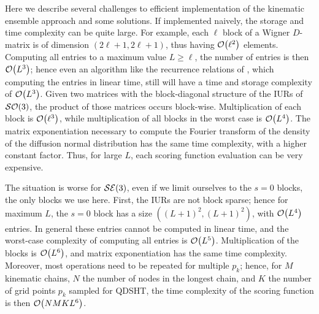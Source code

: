\documentclass[../../main.tex]{subfiles}
\begin{document}
\begin{refsection}
	Here we describe several challenges to efficient implementation of the kinematic ensemble approach and some solutions.
	If implemented naively, the storage and time complexity can be quite large.
	For example, each $\ell$ block of a Wigner $D$-matrix is of dimension $(2\ell+1,2\ell+1)$, thus having $\order{\ell^2}$ elements.
	Computing all entries to a maximum value $L \ge \ell$, the number of entries is then $\order{L^3}$; hence even an algorithm like the recurrence relations of \cite{choiRapidStableDetermination1999}, which computing the entries in linear time, still will have a time and storage complexity of $\order{L^3}$.
	Given two matrices with the block-diagonal structure of the IURs of $\mathcal{SO} (3)$, the product of those matrices occurs block-wise.
	Multiplication of each block is $\order{\ell^3}$, while multiplication of all blocks in the worst case is $\order{L^4}$.
	The matrix exponentiation necessary to compute the Fourier transform of the density of the diffusion normal distribution has the same time complexity, with a higher constant factor.
	Thus, for large $L$, each scoring function evaluation can be very expensive.

	The situation is worse for $\mathcal{SE} (3)$, even if we limit ourselves to the $s=0$ blocks, the only blocks we use here.
	First, the IURs are not block sparse; hence for maximum $L$, the $s=0$ block has a size $((L+1)^2,(L+1)^2)$, with $\order{L^4}$ entries.
	In general these entries cannot be computed in linear time, and the worst-case complexity of computing all entries is $\order{L^5}$.
	Multiplication of the blocks is $\order{L^6}$, and matrix exponentiation has the same time complexity.
	Moreover, most operations need to be repeated for multiple $p_k$; hence, for $M$ kinematic chains, $N$ the number of nodes in the longest chain, and $K$ the number of grid points $p_k$ sampled for QDSHT, the time complexity of the scoring function is then $\order{N M K L^6}$.


\end{refsection}
\end{document}
